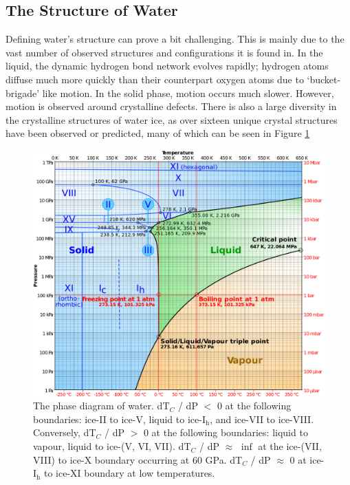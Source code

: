 \subsection{The Structure of Water}
%
%
Defining water's structure can prove a bit challenging. This is mainly
due to the vast number of observed structures and configurations it is
found in. In the liquid, the dynamic hydrogen bond network evolves
rapidly; hydrogen atoms diffuse much more quickly than their
counterpart oxygen atoms due to `bucket-brigade' like motion. In the
solid phase, motion occurs much slower. However, motion is observed
around crystalline defects. There is also a large diversity in the
crystalline structures of water ice, as over sixteen unique crystal
structures have been observed or predicted\cite{Chaplin2018}, many of
which can be seen in Figure \ref{fig:phaseDiagram}

\begin{figure}
\includegraphics[width=\linewidth]{Figures/PhaseDiagram}
\caption{\label{fig:phaseDiagram} The phase diagram of
  water.\cite{Zhang2015} dT$_{C}$ / dP $<$ 0 at the following boundaries:
  ice-II to ice-V, liquid to ice-I$_\mathrm{h}$, and ice-VII to
  ice-VIII. Conversely, dT$_{C}$ / dP $>$ 0 at the following boundaries:
  liquid to vapour, liquid to ice-(V, VI, VII). dT$_{C}$ / dP $\approx$
  $\inf$ at the ice-(VII, VIII) to ice-X boundary occurring at 60 GPa.
  dT$_{C}$ / dP $\approx$ 0 at ice-I$_\mathrm{h}$ to ice-XI boundary at
  low temperatures. }
\end{figure}


